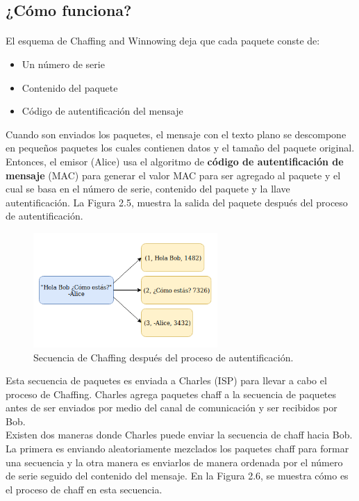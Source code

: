 \documentclass[12pt, a4paper, titlepage]{report}
\begin{document}
		\subsection{¿Cómo funciona?}
		
		\paragraph{}
		El esquema de Chaffing and Winnowing deja que cada paquete conste de: 
		\begin{itemize}
		    \item Un número de serie
		    \item Contenido del paquete
		    \item Código de autentificación del mensaje
		\end{itemize}
		Cuando son enviados los paquetes, el mensaje con el texto plano se descompone en pequeños paquetes los cuales contienen datos y el tamaño del paquete original. Entonces, el emisor (Alice) usa el algoritmo de \textbf{código de autentificación de mensaje} (MAC) para generar el valor MAC para ser agregado al paquete y el cual se basa en el número de serie, contenido del paquete y la llave autentificación. La Figura 2.5, muestra la salida del paquete después del proceso de autentificaci\'on.
		\begin{figure}[H]
			\begin{center}	                  \includegraphics[width=7cm]{./imagenes/MarcoTeorico/descomposicionChaffing.png}
				\caption{Secuencia de Chaffing después del proceso de autentificación.}
			\end{center}
		\end{figure}
		Esta secuencia de paquetes es enviada a Charles (ISP) para llevar a cabo el proceso de Chaffing. Charles agrega paquetes chaff a la secuencia de paquetes antes de ser enviados por medio del canal de comunicación y ser recibidos por Bob. \\
		Existen dos maneras donde Charles puede enviar la secuencia de chaff hacia Bob. La primera es enviando aleatoriamente mezclados los paquetes chaff para formar una secuencia y la otra manera es enviarlos de manera ordenada por el n\'umero de serie seguido del contenido del mensaje. En la Figura 2.6, se muestra cómo es el proceso de chaff en esta secuencia.
\end{document}
